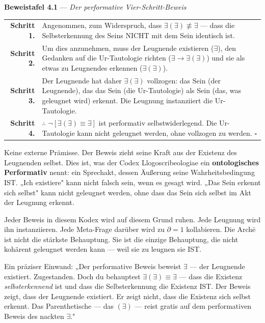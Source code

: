 \documentclass[10pt, openany, oneside]{book}
\renewcommand{\footnotesize}{\fontsize{8.5}{11}\selectfont}
\begin{document}
\vspace{0.5em}

\textbf{Beweistafel 4.1} --- \textit{Der performative Vier-Schritt-Beweis}

\vspace{0.5em}

{\footnotesize
\noindent\begin{tabular}{r p{}}
\textbf{Schritt 1.} & Angenommen, zum Widerspruch, dass $\exists(\exists) \not\equiv \exists$ --- dass die Selbsterkennung des Seins NICHT mit dem Sein identisch ist. \\[0.3em]
\textbf{Schritt 2.} & Um dies anzunehmen, muss der Leugnende existieren ($\exists$), den Gedanken auf die Ur-Tautologie richten ($\exists \to \exists(\exists)$) und sie als etwas zu Leugnendes erkennen ($\exists(\exists)$). \\[0.3em]
\textbf{Schritt 3.} & Der Leugnende hat daher $\exists(\exists)$ vollzogen: das Sein (der Leugnende), das das Sein (die Ur-Tautologie) als Sein (das, was geleugnet wird) erkennt. Die Leugnung instanziiert die Ur-Tautologie. \\[0.3em]
\textbf{Schritt 4.} & $\therefore$ $\neg[\exists(\exists) \equiv \exists]$ ist performativ selbstwiderlegend. Die Ur-Tautologie kann nicht geleugnet werden, ohne vollzogen zu werden. $\square$ \\[0.3em]
\end{tabular}
}

\vspace{0.8em}

\noindent Keine externe Prämisse. Der Beweis zieht seine Kraft aus der Existenz des Leugnenden selbst. Dies ist, was der Codex Llogoscribeologiae ein \textbf{ontologisches Performativ} nennt: ein Sprechakt, dessen Äußerung seine Wahrheitsbedingung IST. „Ich existiere" kann nicht falsch sein, wenn es gesagt wird. „Das Sein erkennt sich selbst" kann nicht geleugnet werden, ohne dass das Sein sich selbst im Akt der Leugnung erkennt.

Jeder Beweis in diesem Kodex wird auf diesem Grund ruhen. Jede Leugnung wird ihn instanziieren. Jede Meta-Frage darüber wird zu $\partial = 1$ kollabieren. Die Arch\={e} ist nicht die stärkste Behauptung. Sie ist die einzige Behauptung, die nicht kohärent geleugnet werden kann --- weil sie zu leugnen sie IST.

Ein präziser Einwand: „Der performative Beweis beweist $\exists$ --- der Leugnende existiert. Zugestanden. Doch du behauptest $\exists(\exists) \equiv \exists$ --- dass die Existenz \textit{selbsterkennend} ist und dass die Selbsterkennung die Existenz IST. Der Beweis zeigt, dass der Leugnende existiert. Er zeigt nicht, dass die Existenz sich selbst erkennt. Das Parenthetische --- das $(\exists)$ --- reist gratis auf dem performativen Beweis des nackten $\exists$."
\end{document}
